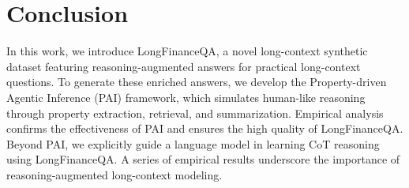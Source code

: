 \section{Conclusion}
\vspace{-2mm}

In this work, we introduce LongFinanceQA, a novel long-context synthetic dataset featuring reasoning-augmented answers for practical long-context questions. To generate these enriched answers, we develop the Property-driven Agentic Inference (PAI) framework, which simulates human-like reasoning through property extraction, retrieval, and summarization. Empirical analysis confirms the effectiveness of PAI and ensures the high quality of LongFinanceQA. Beyond PAI, we explicitly guide a language model in learning CoT reasoning using LongFinanceQA. A series of empirical results underscore the importance of reasoning-augmented long-context modeling.